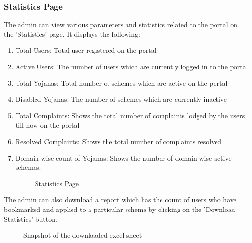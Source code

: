 \documentclass[conference]{IEEEtran}
\begin{document}
\subsubsection{Statistics Page}
The admin can view various parameters and statistics related to the portal on the 'Statistics' page. It displays the following:
\begin{enumerate}
    \item Total Users: Total user registered on the portal
    \item Active Users: The number of users which are currently logged in to the portal
    \item Total Yojanas: Total number of schemes which are active on the portal
    \item Disabled Yojanas: The number of schemes which are currently inactive
    \item Total Complaints: Shows the total number of complaints lodged by the users till now on the portal
    \item Resolved Complaints: Shows the total number of complaints resolved
    \item Domain wise count of Yojanas: Shows the number of domain wise active schemes.
\begin{figure}[h!]
\centering
{}
\caption{Statistics Page}
\end{figure}
\end{enumerate} 
The admin can also download a report which has the count of users who have bookmarked and applied to a particular scheme by clicking on the 'Download Statistics' button. 

\begin{figure}[h!]
\centering
{}
\caption{Snapshot of the downloaded excel sheet}
\end{figure}
\end{document}
